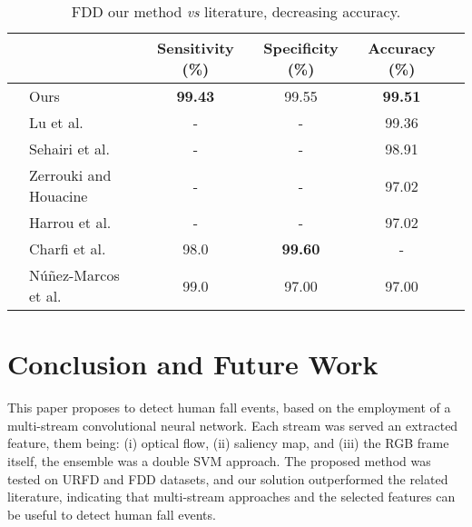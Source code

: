 \documentclass[conference]{IEEEtran}
\begin{document}
\begin{table*}[t]
\centering
\caption{FDD our method \textit{vs} literature, decreasing accuracy.}
\label{tab:fdd-our-their}
\begin{tabular}{llcccl}
\hline
 &                                                      & Sensitivity (\%)  & Specificity (\%)  & Accuracy (\%)     & \\ \hline
 & Ours                                                 & \textbf{99.43}    & 99.55             & \textbf{99.51}    & \\
 & Lu et al.~\cite{lu2018deep}                          & -                 & -                 & 99.36             & \\
 & Sehairi et al.~\cite{sehairi2018elderly}             & -                 & -                 & 98.91             & \\
 & Zerrouki and Houacine~\cite{zerrouki2018combined}    & -                 & -                 & 97.02             & \\
 & Harrou et al.~\cite{harrou2017vision}                & -                 & -                 & 97.02             & \\
 & Charfi et al.~\cite{charfi2012definition}            & 98.0              & \textbf{99.60}    & -                 & \\
 & N\'u\~nez-Marcos et al.~\cite{nunez2017vision}       & 99.0              & 97.00             & 97.00             & \\ \hline
\end{tabular}
\end{table*}
 
\section{Conclusion and Future Work}
\label{sec:conclusion}

This paper proposes to detect human fall events, based on the employment of a multi-stream convolutional neural network. Each stream was served an extracted feature, them being: (i) optical flow, (ii) saliency map, and (iii) the RGB frame itself, the ensemble was a double SVM approach. The proposed method was tested on URFD and FDD datasets, and our solution outperformed the related literature, indicating that multi-stream approaches and the selected features can be useful to detect human fall events.
\end{document}
